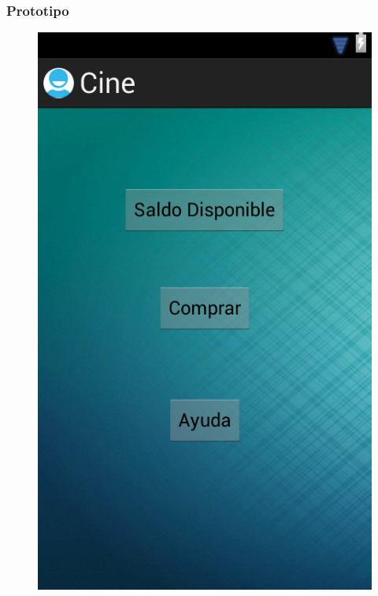 \documentclass{beamer}
\begin{document}
\begin{frame}[allowframbreaks]
\frametitle{Prototipo}
\begin{figure}[h]
\centering
\includegraphics[height=1.0\textheight]{menu.png}
\end{figure}
\end{frame}
\end{document}
